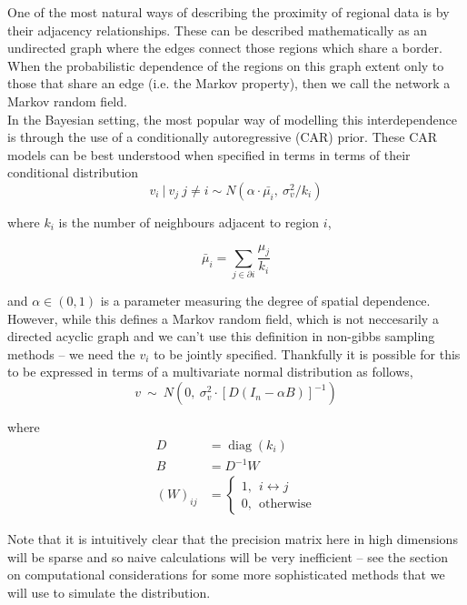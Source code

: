 \documentclass[11pt]{report}
\begin{document}
One of the most natural ways of describing the proximity of regional data is by their adjacency relationships. These can be described mathematically as an undirected graph where the edges connect those regions which share a border. When the probabilistic dependence of the regions on this graph extent only to those that share an edge (i.e. the Markov property), then we call the network a Markov random field. \\ 

In the Bayesian setting, the most popular way of modelling this interdependence is through the use of a conditionally autoregressive (CAR) prior. These CAR models can be best understood when specified in terms in terms of their conditional distribution
\begin{equation}
v_i \ | \ v_j \ j \neq i \sim N(\alpha \cdot \bar{\mu_i}, \ \sigma_v^2/k_i)
\end{equation}

where $k_i$ is the number of neighbours adjacent to region $i$,

\begin{equation}
\bar{\mu}_i = \sum_{j \in \partial i} \frac{\mu_j}{k_i}
\end{equation}

and $\alpha \in (0, 1)$ is a parameter measuring the degree of spatial dependence. \\

However, while this defines a Markov random field, which is not neccesarily a directed acyclic graph and we can't use this definition in non-gibbs sampling methods -- we need the $v_i$ to be jointly specified. Thankfully it is possible \citep{banerjeebook} for this to be expressed in terms of a multivariate normal distribution as follows,
\begin{equation} \label{eq:car}
v \ \sim \ N(0, \ \sigma_v^2 \cdot {[D(I_n - \alpha B)]}^{-1})
\end{equation}

where
\begin{align}
D &= \operatorname{diag}(k_i)  \\
B &= D^{-1} W \\
{(W)}_{ij} &= 
\begin{cases}
1, \ \ i \leftrightarrow j \\
0, \ \ \textrm{otherwise}
\end{cases}
\end{align} 

Note that it is intuitively clear that the precision matrix here in high dimensions will be sparse and so naive calculations will be very inefficient -- see the section on computational considerations for some more sophisticated methods that we will use to simulate the distribution.
\end{document}
